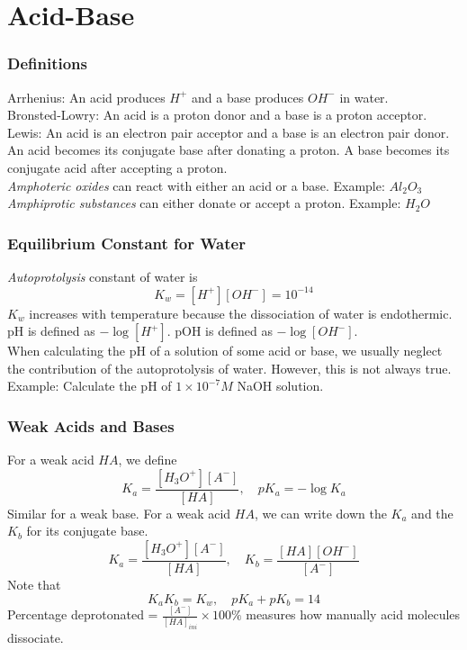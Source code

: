 \documentclass[aspectratio=169]{beamer}
\def\blankline{\\[12pt]}
\begin{document}
\section{Acid-Base}
\begin{frame}
  \frametitle{Definitions}
  Arrhenius: An acid produces $H^{+}$ and a base produces $OH^{-}$ in water. \\
  Bronsted-Lowry: An acid is a proton donor and a base is a proton acceptor. \\
  Lewis: An acid is an electron pair acceptor and a base is an electron pair donor.
  \blankline
  An acid becomes its conjugate base after donating a proton. 
  A base becomes its conjugate acid after accepting a proton.
  \blankline
  \textit{Amphoteric oxides} can react with either an acid or a base. Example: $Al_2O_3$ \\
  \textit{Amphiprotic substances} can either donate or accept a proton. Example: $H_2O$
\end{frame}
\begin{frame}
  \frametitle{Equilibrium Constant for Water}
  \textit{Autoprotolysis} constant of water is
  \begin{equation*}
    K_w = [H^+][OH^-] = 10^{-14}
  \end{equation*}
  $K_w$ increases with temperature because the dissociation of water is endothermic.
  \\[6pt]
  pH is defined as $-\log[H^+]$. pOH is defined as $-\log[OH^-]$. 
  \\[6pt]
  When calculating the pH of a solution of some acid or base, we usually neglect the contribution of the 
  autoprotolysis of water. However, this is not always true. 
  \\[6pt]
  Example: Calculate the pH of $1\times 10^{-7} M$ NaOH solution.
\end{frame}
\begin{frame}
  \frametitle{Weak Acids and Bases}
  For a weak acid $HA$, we define
  \begin{equation*}
    K_a = \frac{[H_3O^+][A^-]}{[HA]}, \quad pK_a = -\log K_a
  \end{equation*}
  Similar for a weak base. 
  For a weak acid $HA$, we can write down the $K_a$ and the $K_b$ for its conjugate base.
  \begin{equation*}
    K_a = \frac{[H_3O^+][A^-]}{[HA]}, \quad K_b = \frac{[HA][OH^-]}{[A^-]}
  \end{equation*}
  Note that
  \begin{equation*}
    K_a K_b = K_w, \quad pK_a + pK_b = 14
  \end{equation*}
  Percentage deprotonated = $\frac{[A^-]}{[HA]_{ini}} \times 100\%$ measures how manually
  acid molecules dissociate.
\end{frame}
\end{document}
